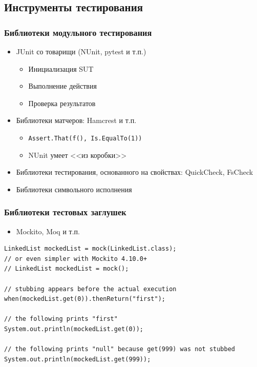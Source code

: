 \documentclass{../../slides-style}
\begin{document}
    \subsection{Инструменты тестирования}

    \begin{frame}[fragile]
        \frametitle{Библиотеки модульного тестирования}
        \begin{itemize}
            \item JUnit со товарищи (NUnit, pytest и т.п.)
            \begin{itemize}
                \item Инициализация SUT
                \item Выполнение действия
                \item Проверка результатов
            \end{itemize}
            \item Библиотеки матчеров: Hamcrest и т.п.
            \begin{itemize}
                \item \texttt{Assert.That(f(), Is.EqualTo(1))}
                \item NUnit умеет <<из коробки>>
            \end{itemize}
            \item Библиотеки тестирования, основанного на свойствах: QuickCheck, FsCheck
            \item Библиотеки символьного исполнения
        \end{itemize}
    \end{frame}

    \begin{frame}[fragile]
        \frametitle{Библиотеки тестовых заглушек}
        \begin{itemize}
            \item Mockito, Moq и т.п.
        \end{itemize}
        \begin{verbatim}
LinkedList mockedList = mock(LinkedList.class);
// or even simpler with Mockito 4.10.0+
// LinkedList mockedList = mock();

// stubbing appears before the actual execution
when(mockedList.get(0)).thenReturn("first");

// the following prints "first"
System.out.println(mockedList.get(0));

// the following prints "null" because get(999) was not stubbed
System.out.println(mockedList.get(999));
        \end{verbatim}
    \end{frame}
\end{document}
